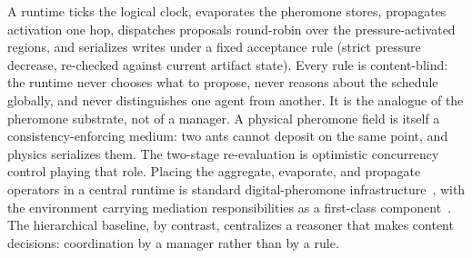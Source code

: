 A runtime ticks the logical clock, evaporates the pheromone stores, propagates activation one hop, dispatches proposals round-robin over the pressure-activated regions, and serializes writes under a fixed acceptance rule (strict pressure decrease, re-checked against current artifact state). Every rule is content-blind: the runtime never chooses what to propose, never reasons about the schedule globally, and never distinguishes one agent from another. It is the analogue of the pheromone substrate, not of a manager. A physical pheromone field is itself a consistency-enforcing medium: two ants cannot deposit on the same point, and physics serializes them. The two-stage re-evaluation is optimistic concurrency control playing that role. Placing the aggregate, evaporate, and propagate operators in a central runtime is standard digital-pheromone infrastructure~\cite{parunak2011mean}, with the environment carrying mediation responsibilities as a first-class component~\cite{weyns2015environment}. The hierarchical baseline, by contrast, centralizes a reasoner that makes content decisions: coordination by a manager rather than by a rule.

